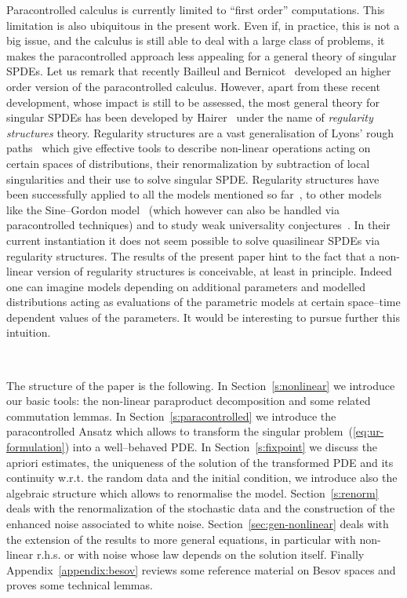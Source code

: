 \documentclass[11pt,reqno]{amsart}
\newcommand{\tmtextit}[1]{{\itshape{#1}}}
\begin{document}
Paracontrolled calculus is currently limited to ``first order'' computations.
This limitation is also ubiquitous in the present work. Even if, in practice,
this is not a big issue, and the calculus is still able to deal with a large
class of problems, it makes the paracontrolled approach less appealing for a
general theory of singular SPDEs. Let us remark that recently Bailleul and
Bernicot~{\cite{bailleul_higher_2016}} developed an higher order version of
the paracontrolled calculus. However, apart from these recent development,
whose impact is still to be assessed, the most general theory for singular
SPDEs has been developed by
Hairer~{\cite{hairer_theory_2014,hairer_singular_2014,friz_course_2014}} under
the name of \tmtextit{regularity structures} theory. Regularity structures are
a vast generalisation of Lyons' rough
paths~{\cite{lyons_differential_1998,lyons_system_2002,lyons_differential_2007}}
which give effective tools to describe non-linear operations acting on certain
spaces of distributions, their renormalization by subtraction of local
singularities and their use to solve singular SPDE. Regularity structures have
been successfully applied to all the models mentioned so
far~{\cite{hairer_theory_2014,hairer_solving_2013}}, to other models like the
Sine--Gordon model~{\cite{hairer_dynamical_2014}} (which however can also be
handled via paracontrolled techniques) and to study weak universality
conjectures~{\cite{hairer_class_2015,hairer_large_2016}}. In their current
instantiation it does not seem possible to solve quasilinear SPDEs via
regularity structures. The results of the present paper hint to the fact that
a non-linear version of regularity structures is conceivable, at least in
principle. Indeed one can imagine models depending on additional parameters
and modelled distributions acting as evaluations of the parametric models at
certain space--time dependent values of the parameters. It would be
interesting to pursue further this intuition.

\

The structure of the paper is the following. In Section~\ref{s:nonlinear} we
introduce our basic tools: the non-linear paraproduct decomposition and some
related commutation lemmas. In Section~\ref{s:paracontrolled} we introduce the
paracontrolled Ansatz which allows to transform the singular
problem~(\ref{eq:ur-formulation}) into a well--behaved PDE. In
Section~\ref{s:fixpoint} we discuss the apriori estimates, the uniqueness of
the solution of the transformed PDE and its continuity w.r.t. the random data
and the initial condition, we introduce also the algebraic structure which
allows to renormalise the model. Section~\ref{s:renorm} deals with the
renormalization of the stochastic data and the construction of the enhanced
noise associated to white noise. Section~\ref{sec:gen-nonlinear} deals with
the extension of the results to more general equations, in particular with
non-linear r.h.s. or with noise whose law depends on the solution itself.
Finally Appendix~\ref{appendix:besov} reviews some reference material on Besov
spaces and proves some technical lemmas.
\end{document}

